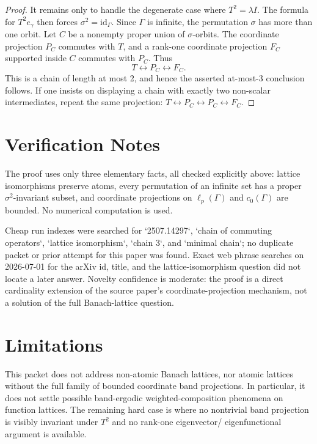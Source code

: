 \documentclass[11pt]{article}
\begin{document}
\begin{proof}
It remains only to handle the degenerate case where $T^2=\lambda I$.  The
formula for $T^2e_\gamma$ then forces $\sigma^2=\mathrm{id}_\Gamma$.  Since
$\Gamma$ is infinite, the permutation $\sigma$ has more than one orbit.  Let
$C$ be a nonempty proper union of $\sigma$-orbits.  The coordinate projection
$P_C$ commutes with $T$, and a rank-one coordinate projection $F_C$ supported
inside $C$ commutes with $P_C$.  Thus
\[
T\leftrightarrow P_C\leftrightarrow F_C.
\]
This is a chain of length at most 2, and hence the asserted at-most-3
conclusion follows.  If one insists on displaying a chain with exactly two
non-scalar intermediates, repeat the same projection:
$T\leftrightarrow P_C\leftrightarrow P_C\leftrightarrow F_C$.
\end{proof}

\section*{Verification Notes}

The proof uses only three elementary facts, all checked explicitly above:
lattice isomorphisms preserve atoms, every permutation of an infinite set has
a proper $\sigma^2$-invariant subset, and coordinate projections on
$\ell_p(\Gamma)$ and $c_0(\Gamma)$ are bounded.  No numerical computation is
used.

Cheap run indexes were searched for `2507.14297`, `chain of commuting
operators`, `lattice isomorphism`, `chain 3`, and `minimal chain`; no duplicate
packet or prior attempt for this paper was found.  Exact web phrase searches on
2026-07-01 for the arXiv id, title, and the lattice-isomorphism question did
not locate a later answer.  Novelty confidence is moderate: the proof is a
direct cardinality extension of the source paper's coordinate-projection
mechanism, not a solution of the full Banach-lattice question.

\section*{Limitations}

This packet does not address non-atomic Banach lattices, nor atomic lattices
without the full family of bounded coordinate band projections.  In particular,
it does not settle possible band-ergodic weighted-composition phenomena on
function lattices.  The remaining hard case is where no nontrivial band
projection is visibly invariant under $T^2$ and no rank-one eigenvector/
eigenfunctional argument is available.
\end{document}
